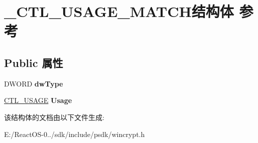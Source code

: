 \hypertarget{struct___c_t_l___u_s_a_g_e___m_a_t_c_h}{}\section{\+\_\+\+C\+T\+L\+\_\+\+U\+S\+A\+G\+E\+\_\+\+M\+A\+T\+C\+H结构体 参考}
\label{struct___c_t_l___u_s_a_g_e___m_a_t_c_h}
\subsection*{Public 属性}
\begin{DoxyCompactItemize}
\item 
\mbox{\label{struct___c_t_l___u_s_a_g_e___m_a_t_c_h_aa0a0a0bdf1c26d1a1edb6b50cdad898b}} 
D\+W\+O\+RD {\bfseries dw\+Type}
\item 
\mbox{\label{struct___c_t_l___u_s_a_g_e___m_a_t_c_h_aca1879d3dbfd95f33be50c9a29a3eb67}} 
\hyperlink{struct___c_t_l___u_s_a_g_e}{C\+T\+L\+\_\+\+U\+S\+A\+GE} {\bfseries Usage}
\end{DoxyCompactItemize}


该结构体的文档由以下文件生成\+:\begin{DoxyCompactItemize}
\item 
E\+:/\+React\+O\+S-\/0../sdk/include/psdk/wincrypt.\+h\end{DoxyCompactItemize}
